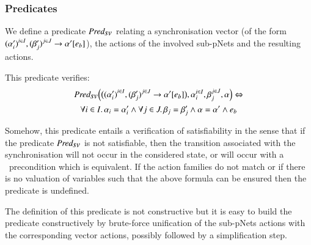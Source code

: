 \documentclass{elsarticle}
\begin{document}

\subsubsection*{Predicates} 
 We 
define a
predicate $\Predsv$ relating a synchronisation vector (of the form ${(\alpha'_i)}^{i\in I}, {(\beta'_j)}^{j\in J}\to \alpha' [e_b]$),
the actions of the involved sub-pNets and the resulting actions.

 This predicate verifies:
\begin{multline*}
\Predsv \Big(
\big({\SV{{(\alpha'_i)}^{i\in I}, {(\beta'_j)}^{j\in J}}{\alpha'}{e_b}}\big)
, \alpha_i^{i\in I}, \beta_j^{j\in J}, \alpha\Big)\Leftrightarrow \\
\forall i\in I.\, \alpha_i=\alpha'_i\land \forall j \in J.\, \beta_j=\beta'_j \land 
\alpha=\alpha' 
\land e_b
\end{multline*}

Somehow, this predicate entails a verification of satisfiability in the sense that if the 
predicate $\Predsv$ is not satisfiable, then the transition associated with the 
synchronisation will not occur in the considered state, or will occur with a \False\ precondition which is equivalent.
If the action families do not match or if there is no valuation of
variables such that the above formula can be ensured then the predicate is undefined.

The definition of this predicate is not constructive but it is easy to build the predicate constructively by brute-force unification of the sub-pNets actions with the corresponding vector actions, possibly followed by a simplification step.
\end{document}
